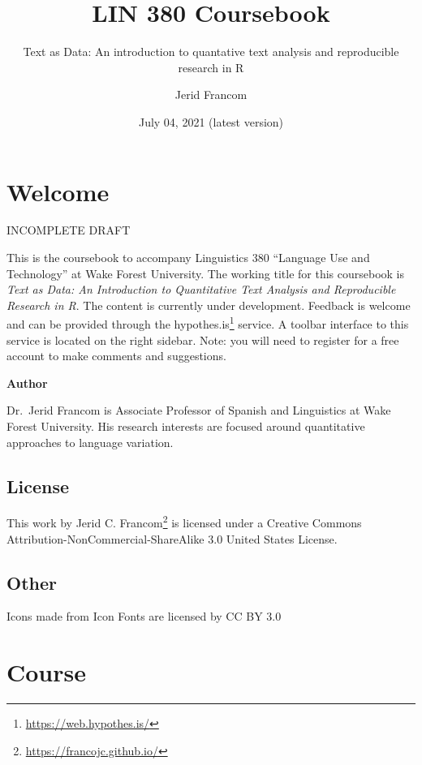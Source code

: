 \documentclass[
]{article}
\title{LIN 380 Coursebook}
\subtitle{Text as Data: An introduction to quantative text analysis and reproducible research in R}
\author{Jerid Francom}
\date{July 04, 2021 (latest version)}
\DeclareRobustCommand{\href}[2]{#2\footnote{\url{#1}}}
\begin{document}
\maketitle

{
\setcounter{tocdepth}{2}
\tableofcontents
}
\hypertarget{welcome}{%
\section*{Welcome}\label{welcome}}

INCOMPLETE DRAFT

This is the coursebook to accompany Linguistics 380 ``Language Use and Technology'' at Wake Forest University. The working title for this coursebook is \emph{Text as Data: An Introduction to Quantitative Text Analysis and Reproducible Research in R}. The content is currently under development. Feedback is welcome and can be provided through the \href{https://web.hypothes.is/}{hypothes.is} service. A toolbar interface to this service is located on the right sidebar. Note: you will need to register for a free account to make comments and suggestions.

\textbf{Author}

Dr.~Jerid Francom is Associate Professor of Spanish and Linguistics at Wake Forest University. His research interests are focused around quantitative approaches to language variation.

\hypertarget{license}{%
\subsection*{License}\label{license}}

This work by \href{https://francojc.github.io/}{Jerid C. Francom} is licensed under a Creative Commons Attribution-NonCommercial-ShareAlike 3.0 United States License.

\hypertarget{other}{%
\subsection*{Other}\label{other}}

Icons made from Icon Fonts are licensed by CC BY 3.0

\hypertarget{course}{%
\section*{Course}\label{course}}
\end{document}
